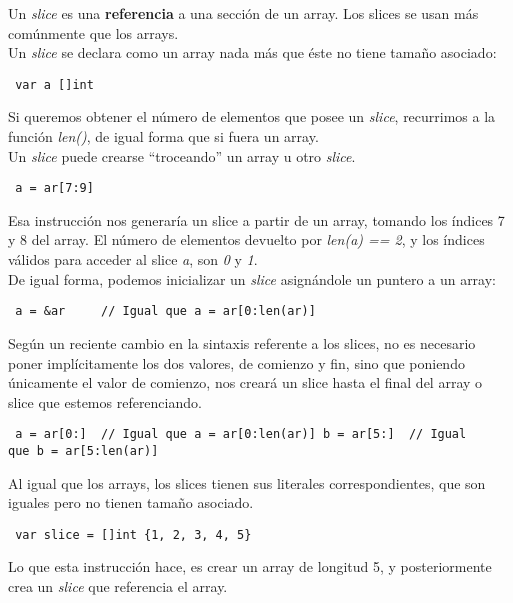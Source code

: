Un \textit{slice} es una \textbf{referencia} a una sección de un array. Los
slices se usan más comúnmente que los arrays.\\

Un \textit{slice} se declara como un array nada más que éste no tiene tamaño
asociado:

\begin{verbatim} var a []int \end{verbatim}

Si queremos obtener el número de elementos que posee un \textit{slice},
recurrimos a la función \textit{len()}, de igual forma que si fuera un array.\\

Un \textit{slice} puede crearse ``troceando'' un array u otro \textit{slice}.

\begin{verbatim} a = ar[7:9] \end{verbatim}

Esa instrucción nos generaría un slice a partir de un array, tomando los índices
7 y 8 del array. El número de elementos devuelto por \textit{len(a) == 2}, y los
índices válidos para acceder al slice \textit{a}, son \textit{0} y \textit{1}.\\

De igual forma, podemos inicializar un \textit{slice} asignándole un puntero
a un array:

\begin{verbatim} a = &ar     // Igual que a = ar[0:len(ar)] \end{verbatim}

Según un reciente cambio en la sintaxis referente a los slices, no es necesario
poner implícitamente los dos valores, de comienzo y fin, sino que poniendo
únicamente el valor de comienzo, nos creará un slice hasta el final del array
o slice que estemos referenciando.

\begin{verbatim} a = ar[0:]  // Igual que a = ar[0:len(ar)] b = ar[5:]  // Igual
que b = ar[5:len(ar)] \end{verbatim}

Al igual que los arrays, los slices tienen sus literales correspondientes, que
son iguales pero no tienen tamaño asociado.

\begin{verbatim} var slice = []int {1, 2, 3, 4, 5} \end{verbatim}

Lo que esta instrucción hace, es crear un array de longitud 5, y posteriormente
crea un \textit{slice} que referencia el array.

